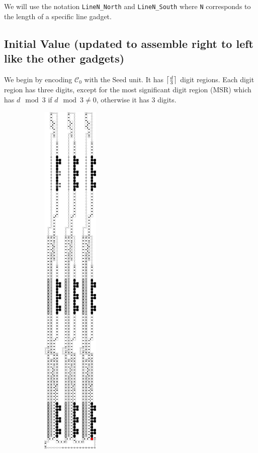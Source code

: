 We will use the notation {\tt LineN\_North} and {\tt LineN\_South} where {\tt N} corresponds to the length of a specific line gadget.


\subsection{Initial Value (updated to assemble right to left like the other gadgets)}
    We begin by encoding $\mathcal{C}_0$ with the Seed unit. It has $\ceil*{\frac{d}{3}}$ digit regions.
    Each digit region has three digits, except for the most significant digit region (MSR) which has $d \mod 3$
    if $d \mod 3 \not= 0$, otherwise it has 3 digits.


    \begin{figure}[H]
        \centering
        \begin{subfigure}[t]{0.3\textwidth}
            \centering
            \includegraphics[width=0.3\textwidth]{seed/seed_overview_case3}

\end{subfigure}
\end{figure}
